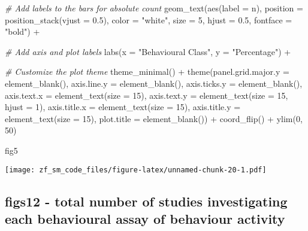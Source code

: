 \documentclass[
]{article}
\newenvironment{Shaded}{\begin{snugshade}}{\end{snugshade}}
\newcommand{\AttributeTok}[1]{\textcolor[rgb]{0.77,0.63,0.00}{#1}}
\newcommand{\CommentTok}[1]{\textcolor[rgb]{0.56,0.35,0.01}{\textit{#1}}}
\newcommand{\DecValTok}[1]{\textcolor[rgb]{0.00,0.00,0.81}{#1}}
\newcommand{\FloatTok}[1]{\textcolor[rgb]{0.00,0.00,0.81}{#1}}
\newcommand{\FunctionTok}[1]{\textcolor[rgb]{0.00,0.00,0.00}{#1}}
\newcommand{\NormalTok}[1]{#1}
\newcommand{\SpecialCharTok}[1]{\textcolor[rgb]{0.00,0.00,0.00}{#1}}
\newcommand{\StringTok}[1]{\textcolor[rgb]{0.31,0.60,0.02}{#1}}
\begin{document}
\begin{Shaded}
\begin{Highlighting}[]
  \CommentTok{\# Add labels to the bars for absolute count  }
  \FunctionTok{geom\_text}\NormalTok{(}\FunctionTok{aes}\NormalTok{(}\AttributeTok{label =}\NormalTok{ n), }\AttributeTok{position =} \FunctionTok{position\_stack}\NormalTok{(}\AttributeTok{vjust =} \FloatTok{0.5}\NormalTok{), }\AttributeTok{color =} \StringTok{"white"}\NormalTok{, }\AttributeTok{size =} \DecValTok{5}\NormalTok{, }\AttributeTok{hjust =} \FloatTok{0.5}\NormalTok{, }\AttributeTok{fontface =} \StringTok{"bold"}\NormalTok{) }\SpecialCharTok{+}
    
  \CommentTok{\# Add axis and plot labels}
  \FunctionTok{labs}\NormalTok{(}\AttributeTok{x =} \StringTok{"Behavioural Class"}\NormalTok{, }\AttributeTok{y =} \StringTok{"Percentage"}\NormalTok{) }\SpecialCharTok{+}
    
  \CommentTok{\# Customize the plot theme }
  \FunctionTok{theme\_minimal}\NormalTok{() }\SpecialCharTok{+}
  \FunctionTok{theme}\NormalTok{(}\AttributeTok{panel.grid.major.y =} \FunctionTok{element\_blank}\NormalTok{(),}
    \AttributeTok{axis.line.y =} \FunctionTok{element\_blank}\NormalTok{(),}
    \AttributeTok{axis.ticks.y =} \FunctionTok{element\_blank}\NormalTok{(),}
    \AttributeTok{axis.text.x =} \FunctionTok{element\_text}\NormalTok{(}\AttributeTok{size =} \DecValTok{15}\NormalTok{),}
    \AttributeTok{axis.text.y =} \FunctionTok{element\_text}\NormalTok{(}\AttributeTok{size =} \DecValTok{15}\NormalTok{, }\AttributeTok{hjust =} \DecValTok{1}\NormalTok{),}
    \AttributeTok{axis.title.x =} \FunctionTok{element\_text}\NormalTok{(}\AttributeTok{size =} \DecValTok{15}\NormalTok{),}
    \AttributeTok{axis.title.y =} \FunctionTok{element\_text}\NormalTok{(}\AttributeTok{size =} \DecValTok{15}\NormalTok{),}
    \AttributeTok{plot.title =} \FunctionTok{element\_blank}\NormalTok{()) }\SpecialCharTok{+}
   \FunctionTok{coord\_flip}\NormalTok{() }\SpecialCharTok{+} 
   \FunctionTok{ylim}\NormalTok{(}\DecValTok{0}\NormalTok{, }\DecValTok{50}\NormalTok{)}
  
  
\NormalTok{fig5}
\end{Highlighting}
\end{Shaded}

\texttt{[image: zf\_sm\_code\_files/figure-latex/unnamed-chunk-20-1.pdf]}

\hypertarget{figs12---total-number-of-studies-investigating-each-behavioural-assay-of-behaviour-activity}{%
\subsection{figs12 - total number of studies investigating each
behavioural assay of behaviour
activity}\label{figs12---total-number-of-studies-investigating-each-behavioural-assay-of-behaviour-activity}}
\end{document}
